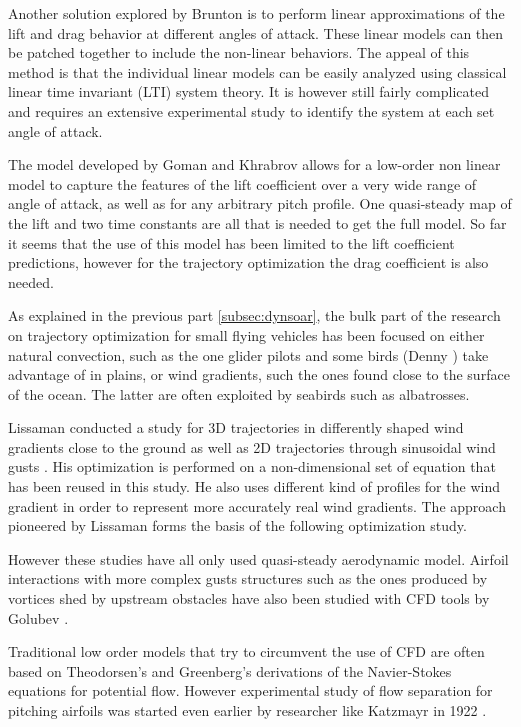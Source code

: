 \par Another solution explored by Brunton \cite{brunton2008unsteady} is to perform linear approximations of the lift and drag behavior at different angles of attack.
These linear models can then be patched together to include the non-linear behaviors.
The appeal of this method is that the individual linear models can be easily analyzed using classical linear time invariant (LTI) system theory.
It is however still fairly complicated and requires an extensive experimental study to identify the system at each set angle of attack.

\par The model developed by Goman and Khrabrov allows for a low-order non linear model to capture the features of the lift coefficient over a very wide range of angle of attack, as well as for any arbitrary pitch profile.
One quasi-steady map of the lift and two time constants are all that is needed to get the full model.
So far it seems that the use of this model has been limited to the lift coefficient predictions, however for the trajectory optimization the drag coefficient is also needed.


\par As explained in the previous part \ref{subsec:dynsoar}, the bulk part of the research on trajectory optimization for small flying vehicles has been focused on either natural convection, such as the one glider pilots and some birds (Denny \cite{denny2009dynamic}) take advantage of in plains, or wind gradients, such the ones found close to the surface of the ocean.
The latter are often exploited by seabirds such as albatrosses.

\par Lissaman conducted a study for 3D trajectories in differently shaped wind gradients close to the ground \cite{lissaman2005wind} as well as 2D trajectories through sinusoidal wind gusts \cite{Lissaman2007neutral}. 
His optimization is performed on a non-dimensional set of equation \cite{chakrabarty2010flight} that has been reused in this study.
He also uses different kind of profiles for the wind gradient in order to represent more accurately real wind gradients.
The approach pioneered by Lissaman forms the basis of the following optimization study.

\par However these studies have all only used quasi-steady aerodynamic model.
Airfoil interactions with more complex gusts structures such as the ones produced by vortices shed by upstream obstacles have also been studied with CFD tools by Golubev \cite{golubev2010high} \cite{golubev2010parametric}.

\par Traditional low order models that try to circumvent the use of CFD are often based on Theodorsen's \cite{theodorsen} and Greenberg's \cite{green} derivations of the Navier-Stokes equations for potential flow.
However experimental study of flow separation for pitching airfoils was started even earlier by researcher like Katzmayr in 1922 \cite{katz}.
